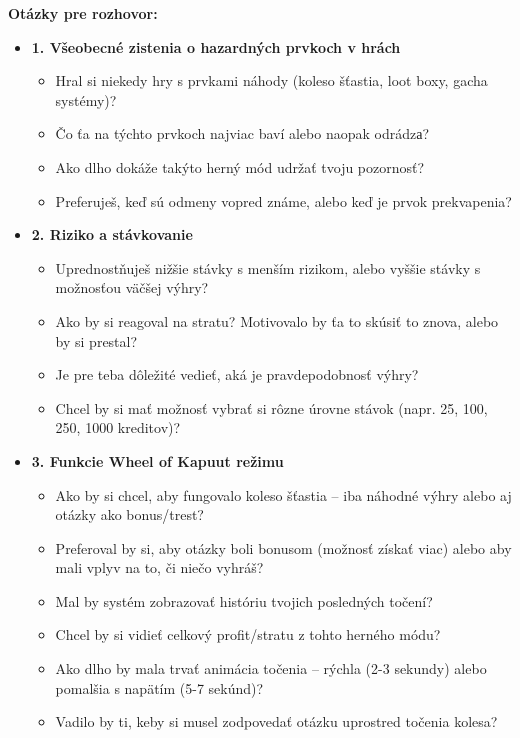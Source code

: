 \documentclass[a4paper,12pt]{article}
\begin{document}
    	\textbf{Otázky pre rozhovor:}
    	\begin{itemize}
    	    \item \textbf{1. Všeobecné zistenia o hazardných prvkoch v hrách}
    	          \begin{itemize}
    	              \item Hral si niekedy hry s prvkami náhody (koleso šťastia, loot boxy, gacha systémy)?
    	              \item Čo ťa na týchto prvkoch najviac baví alebo naopak odrádzа?
    	              \item Ako dlho dokáže takýto herný mód udržať tvoju pozornosť?
    	              \item Preferuješ, keď sú odmeny vopred známe, alebo keď je prvok prekvapenia?
    	          \end{itemize}
    	          
    	    \item \textbf{2. Riziko a stávkovanie}
    	          \begin{itemize}
    	              \item Uprednostňuješ nižšie stávky s menším rizikom, alebo vyššie stávky s možnosťou väčšej výhry?
    	              \item Ako by si reagoval na stratu? Motivovalo by ťa to skúsiť to znova, alebo by si prestal?
    	              \item Je pre teba dôležité vedieť, aká je pravdepodobnosť výhry?
    	              \item Chcel by si mať možnosť vybrať si rôzne úrovne stávok (napr. 25, 100, 250, 1000 kreditov)?
    	          \end{itemize}
    	          
    	    \item \textbf{3. Funkcie Wheel of Kapuut režimu}
    	          \begin{itemize}
    	              \item Ako by si chcel, aby fungovalo koleso šťastia – iba náhodné výhry alebo aj otázky ako bonus/trest?
    	              \item Preferoval by si, aby otázky boli bonusom (možnosť získať viac) alebo aby mali vplyv na to, či niečo vyhráš?
    	              \item Mal by systém zobrazovať históriu tvojich posledných točení?
    	              \item Chcel by si vidieť celkový profit/stratu z tohto herného módu?
    	              \item Ako dlho by mala trvať animácia točenia – rýchla (2-3 sekundy) alebo pomalšia s napätím (5-7 sekúnd)?
    	              \item Vadilo by ti, keby si musel zodpovedať otázku uprostred točenia kolesa?
    	          \end{itemize}
    	          

\end{itemize}
\end{document}
